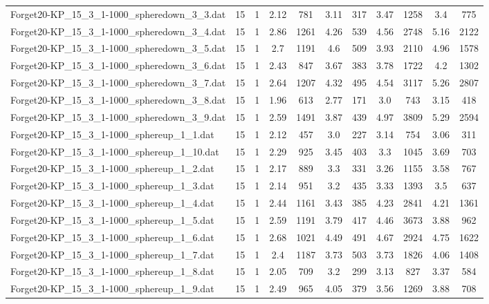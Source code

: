\begin{table}[!ht]
\begin{tabular}{lcccccccccc}
Forget20-KP\_15\_3\_1-1000\_spheredown\_3\_3.dat & 15 & 1 & 2.12 & 781 & 3.11 & 317 & 3.47 & 1258 & 3.4 & 775 \\
Forget20-KP\_15\_3\_1-1000\_spheredown\_3\_4.dat & 15 & 1 & 2.86 & 1261 & 4.26 & 539 & 4.56 & 2748 & 5.16 & 2122 \\
Forget20-KP\_15\_3\_1-1000\_spheredown\_3\_5.dat & 15 & 1 & 2.7 & 1191 & 4.6 & 509 & 3.93 & 2110 & 4.96 & 1578 \\
Forget20-KP\_15\_3\_1-1000\_spheredown\_3\_6.dat & 15 & 1 & 2.43 & 847 & 3.67 & 383 & 3.78 & 1722 & 4.2 & 1302 \\
Forget20-KP\_15\_3\_1-1000\_spheredown\_3\_7.dat & 15 & 1 & 2.64 & 1207 & 4.32 & 495 & 4.54 & 3117 & 5.26 & 2807 \\
Forget20-KP\_15\_3\_1-1000\_spheredown\_3\_8.dat & 15 & 1 & 1.96 & 613 & 2.77 & 171 & 3.0 & 743 & 3.15 & 418 \\
Forget20-KP\_15\_3\_1-1000\_spheredown\_3\_9.dat & 15 & 1 & 2.59 & 1491 & 3.87 & 439 & 4.97 & 3809 & 5.29 & 2594 \\
Forget20-KP\_15\_3\_1-1000\_sphereup\_1\_1.dat & 15 & 1 & 2.12 & 457 & 3.0 & 227 & 3.14 & 754 & 3.06 & 311 \\
Forget20-KP\_15\_3\_1-1000\_sphereup\_1\_10.dat & 15 & 1 & 2.29 & 925 & 3.45 & 403 & 3.3 & 1045 & 3.69 & 703 \\
Forget20-KP\_15\_3\_1-1000\_sphereup\_1\_2.dat & 15 & 1 & 2.17 & 889 & 3.3 & 331 & 3.26 & 1155 & 3.58 & 767 \\
Forget20-KP\_15\_3\_1-1000\_sphereup\_1\_3.dat & 15 & 1 & 2.14 & 951 & 3.2 & 435 & 3.33 & 1393 & 3.5 & 637 \\
Forget20-KP\_15\_3\_1-1000\_sphereup\_1\_4.dat & 15 & 1 & 2.44 & 1161 & 3.43 & 385 & 4.23 & 2841 & 4.21 & 1361 \\
Forget20-KP\_15\_3\_1-1000\_sphereup\_1\_5.dat & 15 & 1 & 2.59 & 1191 & 3.79 & 417 & 4.46 & 3673 & 3.88 & 962 \\
Forget20-KP\_15\_3\_1-1000\_sphereup\_1\_6.dat & 15 & 1 & 2.68 & 1021 & 4.49 & 491 & 4.67 & 2924 & 4.75 & 1622 \\
Forget20-KP\_15\_3\_1-1000\_sphereup\_1\_7.dat & 15 & 1 & 2.4 & 1187 & 3.73 & 503 & 3.73 & 1826 & 4.06 & 1408 \\
Forget20-KP\_15\_3\_1-1000\_sphereup\_1\_8.dat & 15 & 1 & 2.05 & 709 & 3.2 & 299 & 3.13 & 827 & 3.37 & 584 \\
Forget20-KP\_15\_3\_1-1000\_sphereup\_1\_9.dat & 15 & 1 & 2.49 & 965 & 4.05 & 379 & 3.56 & 1269 & 3.88 & 708 \\

\end{tabular}
\end{table}
